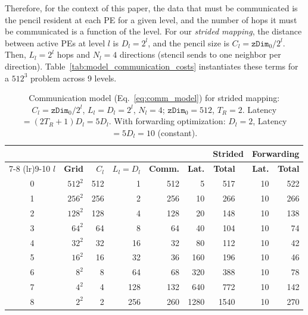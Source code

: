 \documentclass[conference]{IEEEtran}
\begin{document}
            Therefore, for the context of this paper, the data that must be communicated is the pencil resident at each PE for a given level, and the number of hops it must be communicated is a function of the level.  For our \textit{strided mapping}, the distance between active PEs at level \(l\) is \(D_l = 2^l\), and the pencil size is \(C_l = \texttt{zDim}_0/2^l\).  Then, \(L_l = 2^l\) hops and \(N_l = 4\) directions (stencil sends to one neighbor per direction). Table~\ref{tab:model_communication_costs} instantiates these terms for a \(512^3\) problem across 9 levels.


            \begin{table}[t]
                \centering
                \caption{Communication model (Eq.~\ref{eq:comm_model}) for strided mapping: $C_l{=}\texttt{zDim}_0/2^l$, $L_l{=}D_l{=}2^l$, $N_l{=}4$; $\texttt{zDim}_0{=}512$, $T_R{=}2$. Latency${=}(2T_R{+}1)D_l{=}5D_l$. With forwarding optimization: $D_l{=}2$, Latency${=}5D_l{=}10$ (constant).}
                \label{tab:comm_model_strided_512}
                \label{tab:model_communication_costs}
                \label{tab:comm_model_constant_dl}
                \renewcommand{\arraystretch}{1.05}
                \setlength{\tabcolsep}{2pt}
                \scriptsize
                \begin{tabular}{@{}cr rrrr rr rr@{}}
                    \toprule
                    & & & & & & \multicolumn{2}{c}{\textbf{Strided}} & \multicolumn{2}{c}{\textbf{Forwarding}} \\
                    \cmidrule(lr){7-8} \cmidrule(lr){9-10}
                    $l$ & \textbf{Grid} & $C_l$ & $L_l{=}D_l$ & \textbf{Comm.} & \textbf{Lat.} & \textbf{Total} & & \textbf{Lat.} & \textbf{Total} \\
                    \midrule
                    0 & $512^2$ & 512 &   1 & 512 &    5 &  517 & &  10 &  522 \\
                    1 & $256^2$ & 256 &   2 & 256 &   10 &  266 & &  10 &  266 \\
                    2 & $128^2$ & 128 &   4 & 128 &   20 &  148 & &  10 &  138 \\
                    3 &  $64^2$ &  64 &   8 &  64 &   40 &  104 & &  10 &   74 \\
                    4 &  $32^2$ &  32 &  16 &  32 &   80 &  112 & &  10 &   42 \\
                    5 &  $16^2$ &  16 &  32 &  36 &  160 &  196 & &  10 &   46 \\
                    6 &   $8^2$ &   8 &  64 &  68 &  320 &  388 & &  10 &   78 \\
                    7 &   $4^2$ &   4 & 128 & 132 &  640 &  772 & &  10 &  142 \\
                    8 &   $2^2$ &   2 & 256 & 260 & 1280 & 1540 & &  10 &  270 \\
                    \bottomrule
                \end{tabular}
            \end{table}
\end{document}
